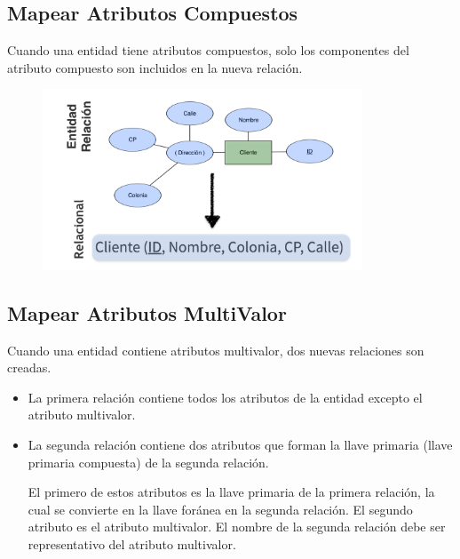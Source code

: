 \documentclass[12pt, fleqn]{report}                             %
\begin{document}
            \subsection{Mapear Atributos Compuestos}

                Cuando una entidad tiene atributos compuestos, solo los componentes del atributo
                compuesto son incluidos en la nueva relación.

                \begin{figure}[h]
                    \centering
                    \includegraphics[width=0.85\textwidth]{MapeoCompuesto}
                \end{figure}


            \clearpage
            \subsection{Mapear Atributos MultiValor}

                Cuando una entidad contiene atributos multivalor, dos nuevas relaciones son creadas.

                \begin{itemize}

                    \item
                        La primera relación contiene todos los atributos de la entidad excepto el
                        atributo multivalor.
                    \item
                        La segunda relación contiene dos atributos que forman la llave primaria
                        (llave primaria compuesta) de la segunda relación.

                        El primero de estos atributos es la llave primaria de la primera relación,
                        la cual se convierte en la llave foránea en la segunda relación.
                        El segundo atributo es el atributo multivalor.
                        El nombre de la segunda relación debe ser representativo del atributo multivalor.

                \end{itemize}  
\end{document}
